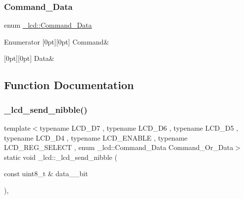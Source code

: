 \subsubsection{\texorpdfstring{Command\+\_\+\+Data}{Command\_Data}}
{\footnotesize\ttfamily enum \hyperlink{namespace__lcd_a9f7614e7fea5ffaebb00ea80e12f3dd3}{\+\_\+lcd\+::\+Command\+\_\+\+Data}}

\begin{DoxyEnumFields}{Enumerator}
[0pt][0pt]{}\hypertarget{namespace__lcd_a9f7614e7fea5ffaebb00ea80e12f3dd3ad12d5ab1f7869bcedb4765e9ab842899}{}\label{namespace__lcd_a9f7614e7fea5ffaebb00ea80e12f3dd3ad12d5ab1f7869bcedb4765e9ab842899} 
Command&\\
\hline

[0pt][0pt]{}\hypertarget{namespace__lcd_a9f7614e7fea5ffaebb00ea80e12f3dd3a56b1d3a17b45a9d1398078bf65e59dc9}{}\label{namespace__lcd_a9f7614e7fea5ffaebb00ea80e12f3dd3a56b1d3a17b45a9d1398078bf65e59dc9} 
Data&\\
\hline

\end{DoxyEnumFields}


\subsection{Function Documentation}
\hypertarget{namespace__lcd_abcab50fa1305ce523c7bc2ecfc10dd4b}{}\label{namespace__lcd_abcab50fa1305ce523c7bc2ecfc10dd4b} 
\subsubsection{\texorpdfstring{\+\_\+lcd\+\_\+send\+\_\+nibble()}{\_lcd\_send\_nibble()}}
{\footnotesize\ttfamily template$<$typename L\+C\+D\+\_\+\+D7 , typename L\+C\+D\+\_\+\+D6 , typename L\+C\+D\+\_\+\+D5 , typename L\+C\+D\+\_\+\+D4 , typename L\+C\+D\+\_\+\+E\+N\+A\+B\+LE , typename L\+C\+D\+\_\+\+R\+E\+G\+\_\+\+S\+E\+L\+E\+CT , enum \+\_\+lcd\+::\+Command\+\_\+\+Data Command\+\_\+\+Or\+\_\+\+Data$>$ \\
static void \+\_\+lcd\+::\+\_\+lcd\+\_\+send\+\_\+nibble (\begin{DoxyParamCaption}\item[{const uint8\+\_\+t \&}]{data\+\_\+\_\+bit }\end{DoxyParamCaption})\hspace{0.3cm}{\ttfamily [inline]}, {\ttfamily [static]}}

